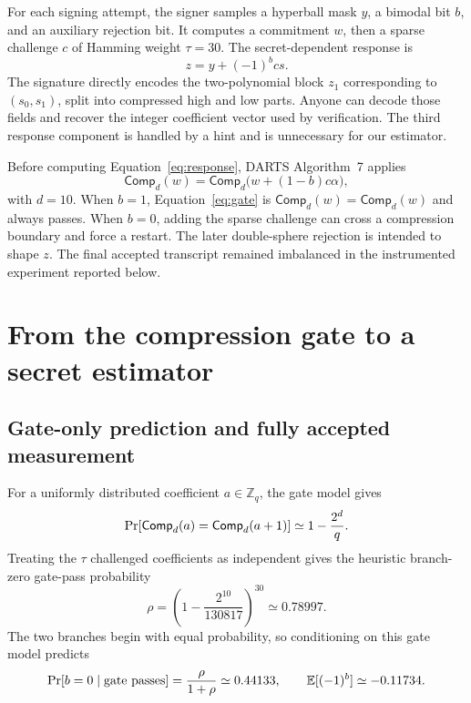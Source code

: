 \documentclass[11pt,a4paper]{article}
\newcommand{\Z}{\mathbb{Z}}
\newcommand{\E}{\mathbb{E}}
\newcommand{\Prb}{\mathop{\rm Pr}}
\newcommand{\Comp}{\mathsf{Comp}}
\begin{document}
For each signing attempt, the signer samples a hyperball mask $y$, a bimodal
bit $b$, and an auxiliary rejection bit.  It computes a commitment $w$, then
a sparse challenge $c$ of Hamming weight $\tau=30$.  The secret-dependent
response is
\begin{equation}
                     z=y+(-1)^bcs.
\label{eq:response}
\end{equation}
The signature directly encodes the two-polynomial block $z_1$ corresponding
to $(s_0,s_1)$, split into compressed high and low parts.  Anyone can decode
those fields and recover the integer coefficient vector used by verification.
The third response component is handled by a hint and is unnecessary for our
estimator.

Before computing Equation~\eqref{eq:response}, DARTS Algorithm~7 applies
\begin{equation}
           \Comp_d(w)=\Comp_d\bigl(w+(1-b)c\alpha\bigr),
\label{eq:gate}
\end{equation}
with $d=10$.  When $b=1$, Equation~\eqref{eq:gate} is
$\Comp_d(w)=\Comp_d(w)$ and always passes.  When $b=0$, adding the sparse
challenge can cross a compression boundary and force a restart.  The later
double-sphere rejection is intended to shape $z$.  The final accepted
transcript remained imbalanced in the instrumented experiment reported below.

\section{From the compression gate to a secret estimator}
\label{sec:leakage}

\subsection{Gate-only prediction and fully accepted measurement}

For a uniformly distributed coefficient $a\in\Z_q$, the gate model gives
\[
  \Prb[\Comp_d(a)=\Comp_d(a+1)]\simeq 1-\frac{2^d}{q}.
\]
Treating the $\tau$ challenged coefficients as independent gives the
heuristic branch-zero gate-pass probability
\begin{equation}
       \rho=\left(1-\frac{2^{10}}{130817}\right)^{30}
            \simeq 0.78997.
\label{eq:rho}
\end{equation}
The two branches begin with equal probability, so conditioning on this gate
model predicts
\begin{equation}
  \Prb[b=0\mid\text{gate passes}]
       =\frac{\rho}{1+\rho}\simeq0.44133,
  \qquad
  \E[(-1)^b]\simeq-0.11734.
\label{eq:branch-bias}
\end{equation}
\end{document}

